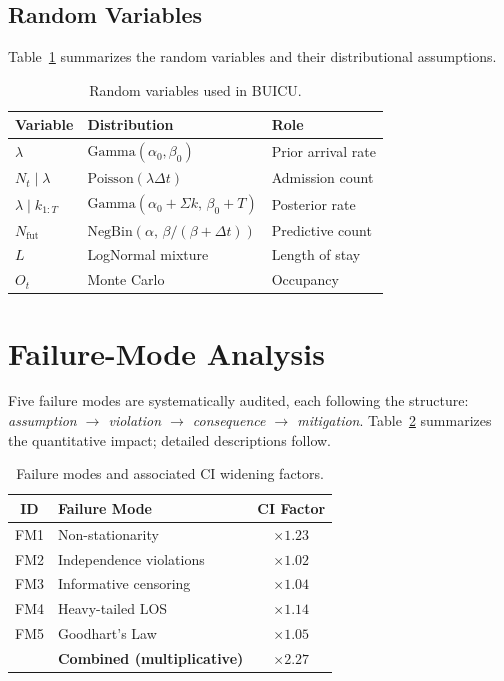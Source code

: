 \documentclass[10pt, twocolumn]{article}
\begin{document}
\subsection{Random Variables}

Table~\ref{tab:rv} summarizes the random variables and their distributional assumptions.

\begin{table}[H]
\centering
\caption{Random variables used in BUICU.}\label{tab:rv}
\renewcommand{\arraystretch}{1.2}
\small
\begin{tabular}{@{}lll@{}}
\toprule
\textbf{Variable} & \textbf{Distribution} & \textbf{Role} \\
\midrule
$\lambda$ & $\mathrm{Gamma}(\alpha_0, \beta_0)$ & Prior arrival rate \\
$N_t \mid \lambda$ & $\mathrm{Poisson}(\lambda \Delta t)$ & Admission count \\
$\lambda \mid k_{1:T}$ & $\mathrm{Gamma}(\alpha_0\!+\!\Sigma k,\, \beta_0\!+\!T)$ & Posterior rate \\
$N_{\text{fut}}$ & $\mathrm{NegBin}(\alpha,\, \beta/(\beta\!+\!\Delta t))$ & Predictive count \\
$L$ & LogNormal mixture & Length of stay \\
$O_t$ & Monte Carlo & Occupancy \\
\bottomrule
\end{tabular}
\end{table}

\section{Failure-Mode Analysis}\label{app:failure}

Five failure modes are systematically audited, each following the structure: \emph{assumption $\to$ violation $\to$ consequence $\to$ mitigation}. Table~\ref{tab:fm} summarizes the quantitative impact; detailed descriptions follow.

\begin{table}[H]
\centering
\caption{Failure modes and associated CI widening factors.}\label{tab:fm}
\renewcommand{\arraystretch}{1.2}
\small
\begin{tabular}{@{}clc@{}}
\toprule
\textbf{ID} & \textbf{Failure Mode} & \textbf{CI Factor} \\
\midrule
FM1 & Non-stationarity & $\times 1.23$ \\
FM2 & Independence violations & $\times 1.02$ \\
FM3 & Informative censoring & $\times 1.04$ \\
FM4 & Heavy-tailed LOS & $\times 1.14$ \\
FM5 & Goodhart's Law & $\times 1.05$ \\
\midrule
& \textbf{Combined (multiplicative)} & $\boldsymbol{\times 2.27}$ \\
\bottomrule
\end{tabular}
\end{table}
\end{document}
